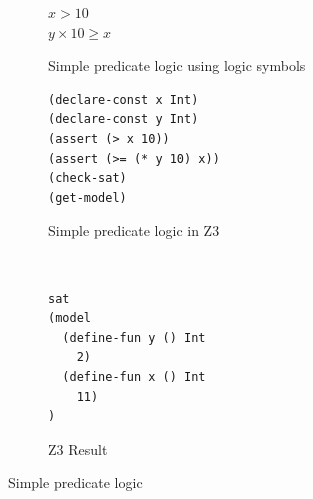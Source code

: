 \documentclass[a4paper]{report}
\begin{document}
\begin{figure}[!htb]
\centering
\begin{subfigure}[b]{\textwidth}
\centering
$x > 10$ \\
$y \times 10 \geq x$
\caption{Simple predicate logic using logic symbols}
\label{fig:Simple predicate logic using logic symbols}
\end{subfigure}
\begin{subfigure}[b]{\textwidth}
\lstset{numbers=left, showspaces=false,
    showstringspaces=false, tabsize=2, breaklines=true,
    xleftmargin=5.0ex,
}
\centering
\begin{lstlisting}[frame=single]
(declare-const x Int)
(declare-const y Int)
(assert (> x 10))
(assert (>= (* y 10) x))
(check-sat)
(get-model)
\end{lstlisting}
\caption{Simple predicate logic in Z3}
\label{fig:Simple predicate logic in Z3}
\end{subfigure}\\
\begin{subfigure}[b]{0.3\textwidth}
\begin{lstlisting}
sat
(model 
  (define-fun y () Int
    2)
  (define-fun x () Int
    11)
)
\end{lstlisting}
\caption{Z3 Result}
\label{fig:Z3 Result}
\end{subfigure}
\caption{Simple predicate logic}
\label{fig:Simple predicate logic}
\end{figure}
\end{document}
